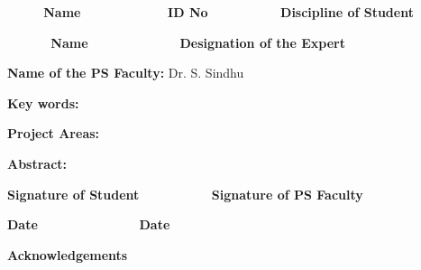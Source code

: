 \documentclass[letterpaper]{article}
\begin{document}
\bigskip


\bigskip


\bigskip

{\bfseries
\ \ \ \ \ Name\ \ \ \  \ \ \ \ \ \ \ \ ID No\ \ \ \ \ \ 
\ \ \ \ Discipline of Student}


\bigskip

{\bfseries
\ \ \ \ \ \ Name \ \ \ \ \ \ \ \ \ \ \ \ Designation of the Expert}


\bigskip


\bigskip


\bigskip

{
\textbf{Name of the PS Faculty: }Dr. S. Sindhu }


\bigskip

{
\textbf{Key words: }\ }

{
\textbf{Project Areas: }\ }

{\bfseries
Abstract: }


\bigskip


\bigskip


\bigskip


\bigskip


\bigskip


\bigskip


\bigskip


\bigskip


\bigskip


\bigskip


\bigskip


\bigskip


\bigskip

{\bfseries
Signature of Student\ \ \ \ \ \ \ \ \ \ Signature of PS Faculty}


\bigskip


\bigskip

{\bfseries
Date\ \ \ \ \ \ \ \ \ \ \ \ \ \ Date }


\bigskip


\bigskip

{\bfseries
Acknowledgements}


\bigskip


\bigskip


\bigskip



\bigskip


\bigskip


\bigskip


\bigskip


\bigskip
\end{document}
